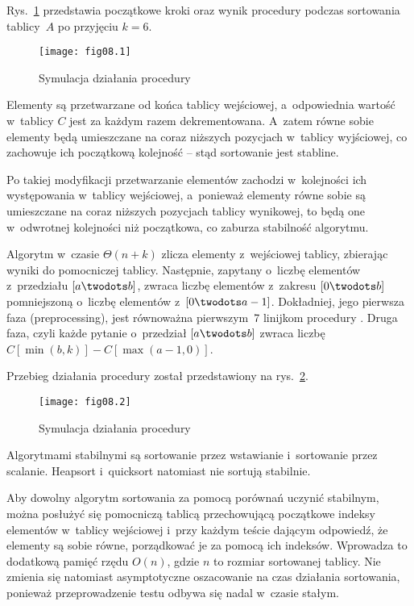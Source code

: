 \exercise %
Rys.~\ref{fig:8.2-1} przedstawia początkowe kroki oraz wynik procedury  podczas sortowania tablicy~$A$ po przyjęciu $k=6$.
\begin{figure}[ht]
	\begin{center}
		\texttt{[image: fig08.1]}
	\end{center}
	\caption{Symulacja działania procedury } \label{fig:8.2-1}
\end{figure}

\exercise %
Elementy są przetwarzane od końca tablicy wejściowej, a~odpowiednia wartość w~tablicy $C$ jest za każdym razem dekrementowana. A~zatem równe sobie elementy będą umieszczane na coraz niższych pozycjach w~tablicy wyjściowej, co zachowuje ich początkową kolejność -- stąd sortowanie jest stabline.

\exercise %
Po takiej modyfikacji przetwarzanie elementów zachodzi w~kolejności ich występowania w~tablicy wejściowej, a~ponieważ elementy równe sobie są  umieszczane na coraz niższych pozycjach tablicy wynikowej, to będą one w~odwrotnej kolejności niż początkowa, co zaburza stabilność algorytmu.

\exercise %
Algorytm w~czasie $\Theta(n+k)$ zlicza elementy z~wejściowej tablicy, zbierając wyniki do pomocniczej tablicy. Następnie, zapytany o~liczbę elementów z~przedziału $[a\twodots b]$, zwraca liczbę elementów z~zakresu $[0\twodots b]$ pomniejszoną o~liczbę elementów z~$[0\twodots a-1]$. Dokładniej, jego pierwsza faza (preprocessing), jest równoważna pierwszym~7 linijkom procedury . Druga faza, czyli każde pytanie o~przedział $[a\twodots b]$ zwraca liczbę $C[\min(b,k)]-C[\max(a-1,0)]$.


\exercise %
Przebieg działania procedury  został przedstawiony na rys.~\ref{fig:8.3-1}.
\begin{figure}[ht]
	\begin{center}
		\texttt{[image: fig08.2]}
	\end{center}
	\caption{Symulacja działania procedury } \label{fig:8.3-1}
\end{figure}

\exercise %
Algorytmami stabilnymi są sortowanie przez wstawianie i~sortowanie przez scalanie. Heapsort i~quicksort natomiast nie sortują stabilnie.

Aby dowolny algorytm sortowania za pomocą porównań uczynić stabilnym, można posłużyć się pomocniczą tablicą przechowującą początkowe indeksy elementów w~tablicy wejściowej i~przy każdym teście dającym odpowiedź, że elementy są sobie równe, porządkować je za pomocą ich indeksów. Wprowadza to dodatkową pamięć rzędu $O(n)$, gdzie $n$ to rozmiar sortowanej tablicy. Nie zmienia się natomiast asymptotyczne oszacowanie na czas działania sortowania, ponieważ przeprowadzenie testu odbywa się nadal w~czasie stałym.

